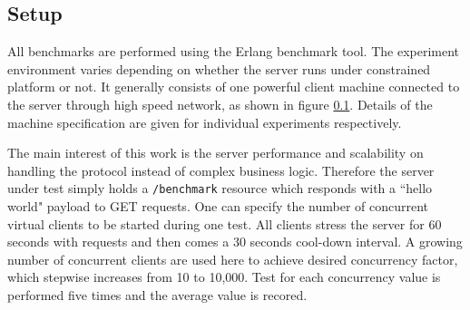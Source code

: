 \subsection{Setup}

All benchmarks are performed using the Erlang benchmark tool. The experiment environment varies depending on whether the server runs under constrained platform or not. It generally consists of one powerful client machine connected to the server through high speed network, as shown in figure \ref{}. Details of the machine specification are given for individual experiments respectively.

\begin{figure}[!htbp]
\centering
\caption{}
\label{fig:experiment_setting}
\end{figure}


The main interest of this work is the server performance and scalability on handling the protocol instead of complex business logic. Therefore the server under test simply holds a \verb|/benchmark| resource which responds with a ``hello world" payload to GET requests. One can specify the number of concurrent virtual clients to be started during one test. All clients stress the server for 60 seconds with requests and then comes a 30 seconds cool-down interval. A growing number of concurrent clients are used here to achieve desired concurrency factor, which stepwise increases from 10 to 10,000. Test for each concurrency value is performed five times and the average value is recored.  







